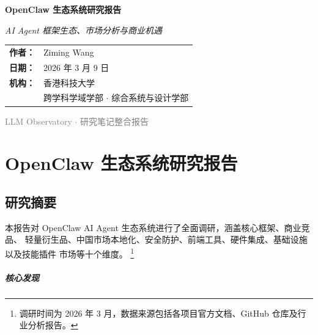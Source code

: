 \documentclass[
  customlatinfont = macos,
]{hkustthesis}
\begin{document}
\mainmatter


\thispagestyle{empty}
\begin{center}
\vspace*{3cm}

{\fontsize{28}{34}\selectfont\bfseries OpenClaw 生态系统研究报告}

\vspace{1.5cm}

{\Large\itshape AI Agent 框架生态、市场分析与商业机遇}

\vspace{3cm}

{\large
\begin{tabular}{rl}
  \textbf{作者：}  & Ziming Wang \\[6pt]
  \textbf{日期：}  & 2026 年 3 月 9 日 \\[6pt]
  \textbf{机构：}  & 香港科技大学 \\
                   & 跨学科学域学部 $\cdot$ 综合系统与设计学部
\end{tabular}
}

\vspace{2cm}

{\small\textcolor{gray}{LLM Observatory $\cdot$ 研究笔记整合报告}}

\vfill
\end{center}
\clearpage

\chapter{OpenClaw 生态系统研究报告}

\section{研究摘要}

本报告对 OpenClaw AI Agent 生态系统进行了全面调研，涵盖核心框架、商业竞品、
轻量衍生品、中国市场本地化、安全防护、前端工具、硬件集成、基础设施以及技能插件
市场等十个维度。%
\footnote{调研时间为 2026 年 3 月，数据来源包括各项目官方文档、GitHub 仓库及行业分析报告。}

\paragraph{核心发现}
\end{document}
